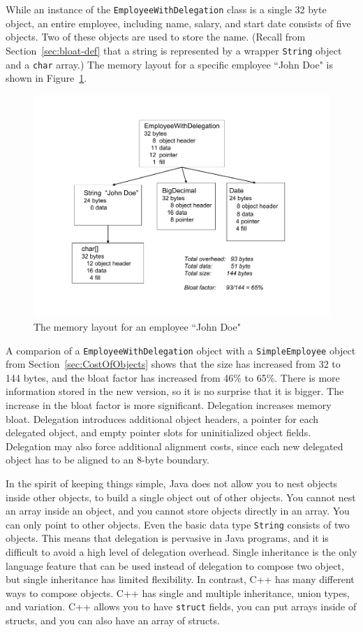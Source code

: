 While an instance of the \texttt{EmployeeWithDelegation} class is a single 32 byte object, an entire employee, including name, salary, and start date consists of five objects. Two of these objects are used to store the name. (Recall from Section~\ref{sec:bloat-def} that a string is represented by a wrapper \texttt{String} object and a \texttt{char} array.) The memory layout for a specific employee ``John Doe" is shown in Figure~\ref{fig:employee-status}. 
 \begin{figure}
  \centering
 \includegraphics[width=.60\textwidth]{Figures/chapter4/employee-status.pdf}
  \caption{The memory layout for an employee ``John Doe"}
  \label{fig:employee-status}
\end{figure}

A comparion of a \texttt{EmployeeWithDelegation} object with a \texttt{SimpleEmployee} object from Section~\ref{sec:CostOfObjects} shows that the size has increased from 32 to 144 bytes, and the bloat factor has increased from 46\% to 65\%. There is more information stored in the new version, so it is no surprise that it is bigger. The increase in the bloat factor is more significant. Delegation increases memory bloat. Delegation introduces additional object headers, a pointer for each delegated object, and empty pointer slots for uninitialized object fields. Delegation may also force additional alignment costs, since each new delegated object has to be aligned to an 8-byte boundary. 

In the spirit of keeping things simple, Java does not allow you to nest objects inside other objects, to build a single object out of other objects. You cannot nest an array inside an object, and you cannot store objects directly in an array.  You can only point to other objects. Even the basic data type \texttt{String} consists of two objects. This means that delegation is pervasive in Java programs, and it is difficult to avoid a high level of delegation overhead. Single inheritance is the only language feature that can be used instead of delegation to compose two object, but single inheritance has limited flexibility.  In contrast, C++ has many different ways to compose objects. C++ has single and multiple inheritance, union types, and variation. C++ allows you to have \texttt{struct} fields, you can put arrays inside of structs, and you can also have an array of structs.  

